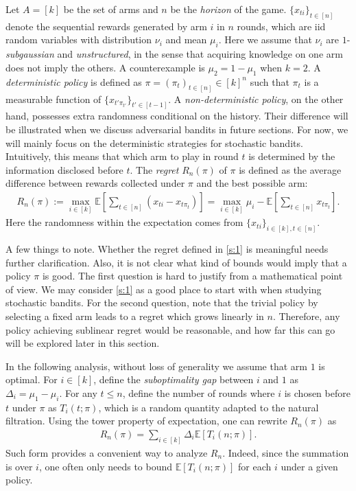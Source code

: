 \documentclass[10pt,a4article]{amsart}
\numberwithin{equation}{section}
\theoremstyle{plain}
\theoremstyle{definition}
\def\E{{\mathbb E}}
\begin{document}
Let $A=[k]$ be the set of arms and $n$ be the \emph{horizon} of the game. $\{x_{ti}\}_{t\in [n]}$ denote the sequential rewards generated by arm $i$ in $n$ rounds, which are iid random variables with distribution $\nu_i$ and mean $\mu_i$. Here we assume that $\nu_i$ are $1$-\emph{subgaussian} and \emph{unstructured}, in the sense that acquiring knowledge on one arm does not imply the others. A counterexample is $\mu_2=1-\mu_1$ when $k= 2$. A \emph{deterministic policy} is defined as $\pi = (\pi_t)_{t\in [n]}\in [k]^n$ such that $\pi_t$ is a measurable function of $\{x_{t'\pi_{t'}}\}_{t'\in [t-1]}$. A \emph{non-deterministic policy}, on the other hand, possesses extra randomness conditional on the history. Their difference will be illustrated when we discuss adversarial bandits in future sections. For now, we will mainly focus on the deterministic strategies for stochastic bandits. Intuitively, this means that which arm to play in round $t$ is determined by the information disclosed before $t$. The \emph{regret} $R_n(\pi)$ of $\pi$ is defined as the average difference between rewards collected under $\pi$ and the best possible arm:
\begin{align}
R_n(\pi):=\max_{i\in [k]}\E\left[\sum_{t\in [n]}(x_{ti}-x_{t\pi_t})\right]=\max_{i\in [k]}\mu_i -\E\left[\sum_{t\in [n]}x_{t\pi_t}\right]. \label{s:1}
\end{align}
Here the randomness within the expectation comes from $\{x_{ti}\}_{i\in [k], t\in [n]}$.

A few things to note. Whether the regret defined in \eqref{s:1} is meaningful needs further clarification. Also, it is not clear what kind of bounds would imply that a policy $\pi$ is good. The first question is hard to justify from a mathematical point of view. We may consider \eqref{s:1} as a good place to start with when studying stochastic bandits.  For the second question, note that the trivial policy by selecting a fixed arm leads to a regret which grows linearly in $n$.  Therefore, any policy achieving sublinear regret would be reasonable, and how far this can go will be explored later in this section.

In the following analysis, without loss of generality we assume that arm $1$ is optimal. For $i\in [k]$, define the \emph{suboptimality gap} between $i$ and $1$ as $\Delta_i=\mu_1-\mu_i$. For any $t\leq n$, define the number of rounds where $i$ is chosen before $t$ under $\pi$ as $T_i(t; \pi)$, which is a random quantity adapted to the natural filtration. Using the tower property of expectation, one can rewrite $R_n(\pi)$ as 
\begin{align}
R_n(\pi)=\sum_{i\in [k]}\Delta_i\E[T_i(n; \pi)].\label{s:2}
\end{align} 
Such form provides a convenient way to analyze $R_n$.  Indeed, since the summation is over $i$, one often only needs to bound $\E[T_i(n; \pi)]$ for each $i$ under a given policy.  
\end{document}
